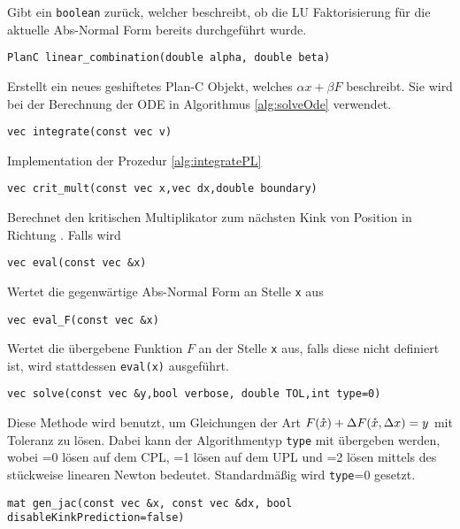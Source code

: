 Gibt ein \texttt{boolean} zurück, welcher beschreibt, ob die LU Faktorisierung für die aktuelle Abs-Normal Form bereits durchgeführt wurde.
\begin{lstlisting}[numbers=none]
PlanC linear_combination(double alpha, double beta)
\end{lstlisting}
Erstellt ein neues geshiftetes Plan-C Objekt, welches $\alpha x + \beta F$ beschreibt. Sie wird bei der Berechnung der ODE in Algorithmus \ref{alg:solveOde} verwendet.
\begin{lstlisting}[numbers=none]
vec integrate(const vec v)
\end{lstlisting}
Implementation der Prozedur \ref{alg:integratePL}
\begin{lstlisting}[numbers=none]
vec crit_mult(const vec x,vec dx,double boundary)
\end{lstlisting}
Berechnet den kritischen Multiplikator zum nächsten Kink von Position  in Richtung . Falls  wird 
\begin{lstlisting}[numbers=none]
vec eval(const vec &x)
\end{lstlisting}
Wertet die gegenwärtige Abs-Normal Form an Stelle \texttt{x} aus
\begin{lstlisting}[numbers=none]
vec eval_F(const vec &x)
\end{lstlisting}
Wertet die übergebene Funktion $F$ an der Stelle \texttt{x} aus, falls diese nicht definiert ist, wird stattdessen \texttt{eval(x)} ausgeführt.
\begin{lstlisting}[numbers=none]
vec solve(const vec &y,bool verbose, double TOL,int type=0)
\end{lstlisting}
Diese Methode wird benutzt, um Gleichungen der Art $F(\mathring{x})+\Delta F(\mathring{x},\Delta x) = y$ mit Toleranz  zu lösen. Dabei kann der Algorithmentyp \texttt{type} mit übergeben werden, wobei =0 lösen auf dem CPL, =1 lösen auf dem UPL und =2 lösen mittels des stückweise linearen Newton bedeutet. Standardmäßig wird \texttt{type}=0 gesetzt.    
\begin{lstlisting}[numbers=none]
mat gen_jac(const vec &x, const vec &dx, bool disableKinkPrediction=false)
\end{lstlisting}
